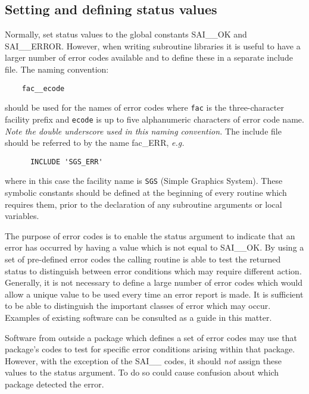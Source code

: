 \subsection {Setting and defining status values}

Normally, set status values to the global constants SAI\_\_OK and SAI\_\_ERROR.
However, when writing subroutine libraries it is useful to have a larger
number of error codes available and to define these in a separate include file.
The naming convention:

\begin{small}
\begin{verbatim}
    fac__ecode
\end{verbatim}
\end{small}

should be used for the names of error codes where {\tt fac} is the
three-character facility prefix and {\tt ecode} is up to five alphanumeric
characters of error code name.
{\em Note the double underscore used in this naming convention.}
The include file should be referred to by the name fac\_ERR, {\em e.g.}

\begin{small}
\begin{verbatim}
      INCLUDE 'SGS_ERR'
\end{verbatim}
\end{small}

where in this case the facility name is {\tt SGS} (Simple Graphics System).
These symbolic constants should be defined at the beginning of every
routine which requires them, prior to the declaration of any subroutine
arguments or local variables.

The purpose of error codes is to enable the status argument to indicate that an
error has occurred by having a value which is not equal to SAI\_\_OK.
By using a set of pre-defined error codes the calling routine is able to test
the returned status to distinguish between error conditions which may require
different action.
Generally, it is not necessary to define a large number of error codes which
would allow a unique value to be used every time an error report is made.
It is sufficient to be able to distinguish the important classes of error which
may occur.
Examples of existing software can be consulted as a guide in this matter.

Software from outside a package which defines a set of error codes may
use that package's codes to test for specific error conditions arising within
that package.
However, with the exception of the SAI\_\_ codes, it should {\em not} assign
these values to the status argument.
To do so could cause confusion about which package detected the error.

